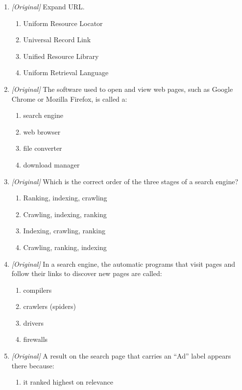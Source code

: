 \begin{enumerate}[label=\textbf{Q\arabic*.}, leftmargin=*]
\item \textit{[Original]} Expand URL.
  \begin{enumerate}[label=\Alph*.]
    \item Uniform Resource Locator
    \item Universal Record Link
    \item Unified Resource Library
    \item Uniform Retrieval Language
  \end{enumerate}
\item \textit{[Original]} The software used to open and view web pages, such
  as Google Chrome or Mozilla Firefox, is called a:
  \begin{enumerate}[label=\Alph*.]
    \item search engine
    \item web browser
    \item file converter
    \item download manager
  \end{enumerate}
\item \textit{[Original]} Which is the correct order of the three stages of a
  search engine?
  \begin{enumerate}[label=\Alph*.]
    \item Ranking, indexing, crawling
    \item Crawling, indexing, ranking
    \item Indexing, crawling, ranking
    \item Crawling, ranking, indexing
  \end{enumerate}
\item \textit{[Original]} In a search engine, the automatic programs that
  visit pages and follow their links to discover new pages are called:
  \begin{enumerate}[label=\Alph*.]
    \item compilers
    \item crawlers (spiders)
    \item drivers
    \item firewalls
  \end{enumerate}
\item \textit{[Original]} A result on the search page that carries an ``Ad''
  label appears there because:
  \begin{enumerate}[label=\Alph*.]
    \item it ranked highest on relevance

\end{enumerate}
\end{enumerate}
